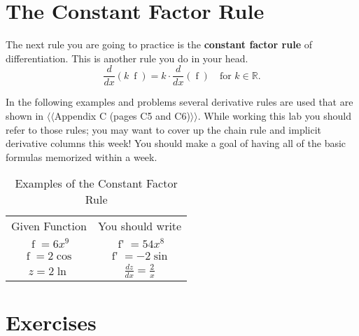\documentclass[12pt,]{book}
\newcommand{\terminology}[1]{\textbf{#1}}
\theoremstyle{plain}
\theoremstyle{definition}
\numberwithin{equation}{section}
\newcommand{\hrulemedium}{\noalign{\hrule height 0.07em}}
\newcommand{\hrulethick} {\noalign{\hrule height 0.11em}}
\newcommand{\reals}{\mathbb{R}}
\newcommand{\fe}[2]{\mathop{{#1}{\left(#2\right)}}}
\newcommand{\fd}[1]{#1'}
\newcommand{\lz}[2]{\frac{d#1}{d#2}}
\newcommand{\lzoo}[2]{{\frac{d}{d#1}}{\left(#2\right)}}
\begin{document}
\section[The Constant Factor Rule]{The Constant Factor Rule}\label{section-constant-factor-rule}
The next rule you are going to practice is the \terminology{constant factor rule} of differentiation.  This is another rule you do in your head. \begin{equation}\lzoo{x}{k\ \fe{f}{x}}=k\cdot\lzoo{x}{\fe{f}{x}}\quad\text{for }k\in\reals\text{.}\label{men-3}\end{equation}%
\par
In the following examples and problems several derivative rules are used that are shown in {$\langle\langle$Appendix C (pages C5 and C6)$\rangle\rangle$}.  While working this lab you should refer to those rules; you may want to cover up the chain rule and implicit derivative columns this week!  You should make a goal of having all of the basic formulas memorized within a week.%
\begin{table}
\centering
\caption{Examples of the Constant Factor Rule\label{table-constant-factor-rule}}
\begin{tabular}{cc}\hrulethick
Given Function&You should write\\\hrulemedium
\(\fe{f}{x}=6x^9\)&\(\fe{\fd{f}}{x}=54x^8\)\\
\(\fe{f}{\theta}=2\fe{\cos}{\theta}\)&\(\fe{\fd{f}}{\theta}=-2\fe{\sin}{\theta}\)\\
\(z=2\fe{\ln}{x}\)&\(\lz{z}{x}=\frac{2}{x}\)
\end{tabular}
\end{table}
\typeout{************************************************}
\typeout{************************************************}
\section*{Exercises}\label{exercises-30}
\end{document}
